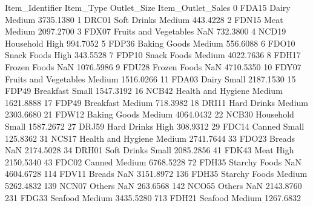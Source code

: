 \documentclass[
]{book}
\newenvironment{Shaded}{\begin{snugshade}}{\end{snugshade}}
\newcommand{\NormalTok}[1]{#1}
\begin{document}
\begin{Shaded}
\begin{Highlighting}[]
\NormalTok{    Item\_Identifier              Item\_Type Outlet\_Size  Item\_Outlet\_Sales}
\NormalTok{0             FDA15                  Dairy      Medium          3735.1380}
\NormalTok{1             DRC01            Soft Drinks      Medium           443.4228}
\NormalTok{2             FDN15                   Meat      Medium          2097.2700}
\NormalTok{3             FDX07  Fruits and Vegetables         NaN           732.3800}
\NormalTok{4             NCD19              Household        High           994.7052}
\NormalTok{5             FDP36           Baking Goods      Medium           556.6088}
\NormalTok{6             FDO10            Snack Foods        High           343.5528}
\NormalTok{7             FDP10            Snack Foods      Medium          4022.7636}
\NormalTok{8             FDH17           Frozen Foods         NaN          1076.5986}
\NormalTok{9             FDU28           Frozen Foods         NaN          4710.5350}
\NormalTok{10            FDY07  Fruits and Vegetables      Medium          1516.0266}
\NormalTok{11            FDA03                  Dairy       Small          2187.1530}
\NormalTok{15            FDP49              Breakfast       Small          1547.3192}
\NormalTok{16            NCB42     Health and Hygiene      Medium          1621.8888}
\NormalTok{17            FDP49              Breakfast      Medium           718.3982}
\NormalTok{18            DRI11            Hard Drinks      Medium          2303.6680}
\NormalTok{21            FDW12           Baking Goods      Medium          4064.0432}
\NormalTok{22            NCB30              Household       Small          1587.2672}
\NormalTok{27            DRJ59            Hard Drinks        High           308.9312}
\NormalTok{29            FDC14                 Canned       Small           125.8362}
\NormalTok{31            NCS17     Health and Hygiene      Medium          2741.7644}
\NormalTok{33            FDO23                 Breads         NaN          2174.5028}
\NormalTok{34            DRH01            Soft Drinks       Small          2085.2856}
\NormalTok{41            FDK43                   Meat        High          2150.5340}
\NormalTok{43            FDC02                 Canned      Medium          6768.5228}
\NormalTok{72            FDH35          Starchy Foods         NaN          4604.6728}
\NormalTok{114           FDV11                 Breads         NaN          3151.8972}
\NormalTok{136           FDH35          Starchy Foods      Medium          5262.4832}
\NormalTok{139           NCN07                 Others         NaN           263.6568}
\NormalTok{142           NCO55                 Others         NaN          2143.8760}
\NormalTok{231           FDG33                Seafood      Medium          3435.5280}
\NormalTok{713           FDH21                Seafood      Medium          1267.6832}
\end{Highlighting}
\end{Shaded}
\end{document}
